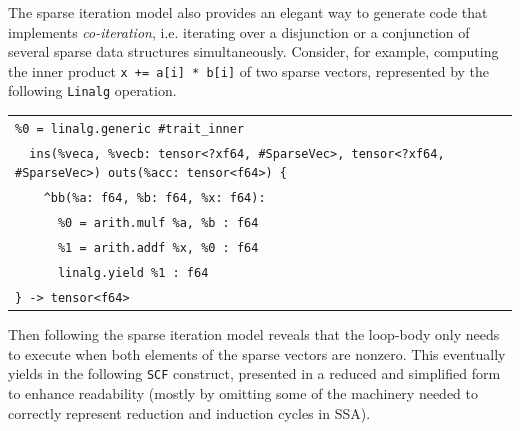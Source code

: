 \documentclass[10pt]{article}
\newcommand{\exam}{\begin{flushleft}\scriptsize\begin{tabular}{l}}
\newcommand{\maxe}{\end{tabular}\end{flushleft}}
\begin{document}
The sparse iteration model also provides an elegant way to generate code that implements \emph{co-iteration}, i.e. iterating over a disjunction or a conjunction of several sparse data structures simultaneously. Consider, for example, computing the inner product \texttt{x += a[i] * b[i]} of two sparse vectors, represented by the following \texttt{Linalg} operation.

\exam
\verb"%0 = linalg.generic #trait_inner" \\
\verb"  ins(%veca, %vecb: tensor<?xf64, #SparseVec>, tensor<?xf64, #SparseVec>) outs(%acc: tensor<f64>) {" \\
\verb"    ^bb(%a: f64, %b: f64, %x: f64):" \\
\verb"      %0 = arith.mulf %a, %b : f64" \\
\verb"      %1 = arith.addf %x, %0 : f64" \\
\verb"      linalg.yield %1 : f64" \\
\verb"} -> tensor<f64>" \\
\maxe

Then following the sparse iteration model reveals that the loop-body only needs to execute when both elements of the sparse vectors are nonzero. This eventually yields in the following \texttt{SCF} construct, presented in a reduced and simplified form to enhance readability (mostly by omitting some of the machinery needed to correctly represent reduction and induction cycles in SSA).
\end{document}

